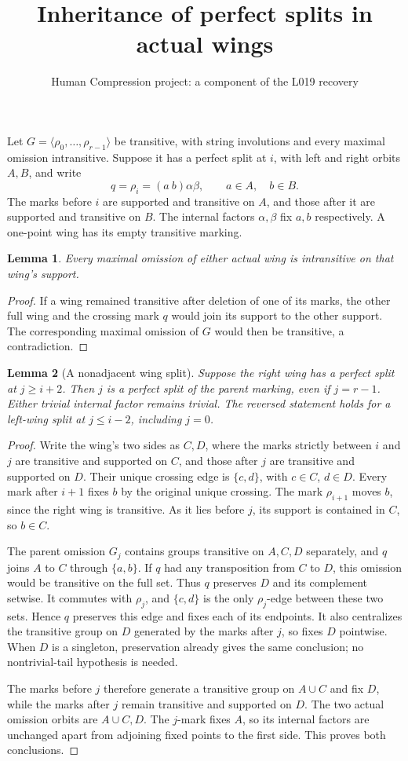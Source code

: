 \documentclass[11pt,a4paper]{article}
\title{Inheritance of perfect splits in actual wings}
\author{Human Compression project: a component of the L019 recovery}
\date{}
\newtheorem{lemma}{Lemma}
\newcommand{\gen}[1]{\langle#1\rangle}
\begin{document}
\maketitle
Let $G=\gen{\rho_0,\ldots,\rho_{r-1}}$ be transitive, with
string involutions and every maximal omission intransitive.
Suppose it has a perfect split at $i$, with left and right
orbits $A,B$, and write
\[
 q=\rho_i=(a\ b)\alpha\beta,
 \qquad a\in A,\quad b\in B.
\]
The marks before $i$ are supported and transitive on $A$,
and those after it are supported and transitive on $B$.
The internal factors $\alpha,\beta$ fix $a,b$ respectively.
A one-point wing has its empty transitive marking.

\begin{lemma}\label{omissions}
Every maximal omission of either actual wing is intransitive
on that wing's support.
\end{lemma}
\begin{proof}
If a wing remained transitive after deletion of one of its
marks, the other full wing and the crossing mark $q$ would
join its support to the other support. The corresponding
maximal omission of $G$ would then be transitive, a contradiction.
\end{proof}

\begin{lemma}[A nonadjacent wing split]\label{far}
Suppose the right wing has a perfect split at $j\ge i+2$.
Then $j$ is a perfect split of the parent marking, even if
$j=r-1$. Either trivial internal factor remains trivial.
The reversed statement holds for a left-wing split at $j\le i-2$,
including $j=0$.
\end{lemma}
\begin{proof}
Write the wing's two sides as $C,D$, where the marks strictly
between $i$ and $j$ are transitive and supported on $C$,
and those after $j$ are transitive and supported on $D$.
Their unique crossing edge is $\{c,d\}$, with $c\in C$,
$d\in D$. Every mark after $i+1$ fixes $b$ by the original
unique crossing. The mark $\rho_{i+1}$ moves $b$, since
the right wing is transitive. As it lies before $j$, its
support is contained in $C$, so $b\in C$.

The parent omission $G_j$ contains groups transitive on
$A,C,D$ separately, and $q$ joins $A$ to $C$ through
$\{a,b\}$. If $q$ had any transposition from $C$ to $D$,
this omission would be transitive on the full set. Thus $q$
preserves $D$ and its complement setwise. It commutes with
$\rho_j$, and $\{c,d\}$ is the only $\rho_j$-edge between
these two sets. Hence $q$ preserves this edge and fixes each
of its endpoints. It also centralizes the transitive group
on $D$ generated by the marks after $j$, so fixes $D$
pointwise. When $D$ is a singleton, preservation already
gives the same conclusion; no nontrivial-tail hypothesis
is needed.

The marks before $j$ therefore generate a transitive group
on $A\cup C$ and fix $D$, while the marks after $j$ remain
transitive and supported on $D$. The two actual omission
orbits are $A\cup C,D$. The $j$-mark fixes $A$, so its
internal factors are unchanged apart from adjoining fixed
points to the first side. This proves both conclusions.
\end{proof}
\end{document}
